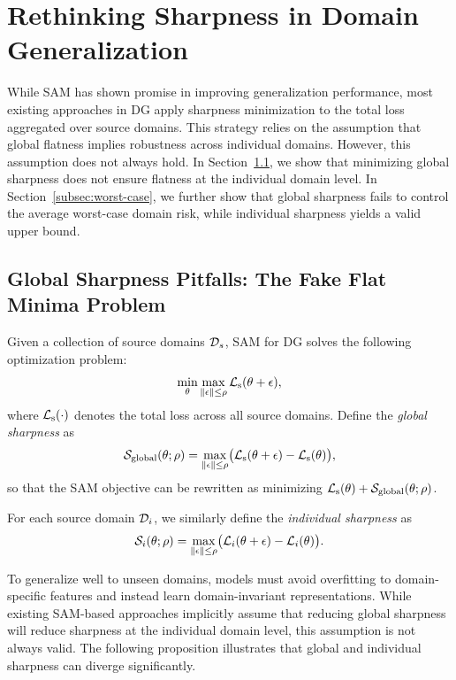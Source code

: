 \documentclass{article}
\theoremstyle{plain}
\theoremstyle{definition}
\theoremstyle{remark}
\begin{document}
\section{Rethinking Sharpness in Domain Generalization}\label{sec:motivation}
While SAM has shown promise in improving generalization performance, most existing approaches in DG apply sharpness minimization to the total loss aggregated over source domains. This strategy relies on the assumption that global flatness implies robustness across individual domains. However, this assumption does not always hold. In Section~\ref{subsec:fake_flat_minima}, we show that minimizing global sharpness does not ensure flatness at the individual domain level. In Section~\ref{subsec:worst-case}, we further show that global sharpness fails to control the average worst-case domain risk, while individual sharpness yields a valid upper bound.

\subsection{Global Sharpness Pitfalls: The Fake Flat Minima Problem}\label{subsec:fake_flat_minima}
Given a collection of source domains ${\mathcal{D}}_s$, SAM for DG solves the following optimization problem:
\[
\min_\theta \max_{\|\epsilon\|\leq \rho}{\mathcal{L}}_{\text{s}}(\theta+\epsilon),
\]
where ${\mathcal{L}}_{\text{s}}(\cdot)$ denotes the total loss across all source domains. Define the \emph{global sharpness} as
\[
{\mathcal{S}}_{\text{global}}(\theta;\rho)= \max_{\|\epsilon\|\leq \rho}\bigl({\mathcal{L}}_{\text{s}}(\theta+\epsilon) - {\mathcal{L}}_{\text{s}}(\theta)\bigr),
\]
so that the SAM objective can be rewritten as minimizing ${\mathcal{L}}_{\text{s}}(\theta) + {\mathcal{S}}_{\text{global}}(\theta;\rho)$. %

For each source domain ${\mathcal{D}}_i$, we similarly define the \emph{individual sharpness} as
\[
{\mathcal{S}}_i(\theta;\rho) = \max_{\|\epsilon\|\leq \rho} \bigl({\mathcal{L}}_{i}(\theta+\epsilon) - {\mathcal{L}}_{i}(\theta)\bigr).
\]

To generalize well to unseen domains, models must avoid overfitting to domain-specific features and instead learn domain-invariant representations. While existing SAM-based approaches implicitly assume that reducing global sharpness will reduce sharpness at the individual domain level, this assumption is not always valid. The following proposition illustrates that global and individual sharpness can diverge significantly.
\end{document}
